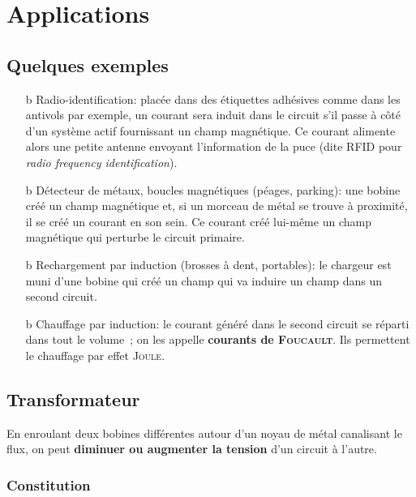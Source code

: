\documentclass[../../main/main.tex]{subfiles}
\begin{document}
\section{Applications}
\label{ssec:cplimpl}
\subsection{Quelques exemples}

\begin{itemize}
	\item[b]{Radio-identification}: placée dans des étiquettes adhésives comme
	dans les antivols par exemple, un courant sera induit dans le circuit s'il
	passe à côté d'un système actif fournissant un champ magnétique. Ce courant
	alimente alors une petite antenne envoyant l'information de la puce (dite
	RFID pour \textit{radio frequency identification}).
	\item[b]{Détecteur de métaux, boucles magnétiques (péages, parking)}: une
	bobine créé un champ magnétique et, si un morceau de métal se trouve à
	proximité, il se créé un courant en son sein. Ce courant créé lui-même un
	champ magnétique qui perturbe le circuit primaire.
	\item[b]{Rechargement par induction (brosses à dent, portables)}: le chargeur
	est muni d'une bobine qui créé un champ qui va induire un champ dans un second
	circuit.
	\item[b]{Chauffage par induction}: le courant généré dans le second circuit se
	réparti dans tout le volume~; on les appelle \textbf{courants de
		\textsc{Foucault}}. Ils permettent le chauffage par effet \textsc{Joule}.
\end{itemize}

\subsection{Transformateur}
En enroulant deux bobines différentes
autour d'un noyau de métal canalisant le flux, on peut \textbf{diminuer ou
	augmenter la tension} d'un circuit à l'autre.

\subsubsection{Constitution}
\end{document}
